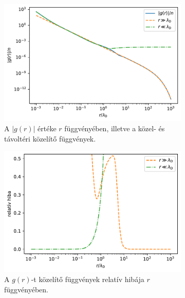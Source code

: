\documentclass[a4paper,12pt,titlepage]{article}
\begin{document}
\begin{figure}[h!]
	\centering
	\begin{subfigure}{0.48\linewidth}
		\centering
		\includegraphics[width=\linewidth]{G_sc.pdf}
		\caption{\centering A $\left| g(r) \right|$ értéke $r$ függvényében, illetve a közel- és távoltéri közelítő függvények.}
		\label{G-sc-fig}
	\end{subfigure}
	\begin{subfigure}{0.48\linewidth}
		\centering
		\includegraphics[width=0.98\linewidth]{G_sc_error.pdf}
		\caption{\centering A $g(r)$-t közelítő függvények relatív hibája $r$ függvényében.}
		\label{G-sc-error-fig}
	\end{subfigure}
	\caption{}
\end{figure}



\end{document}
